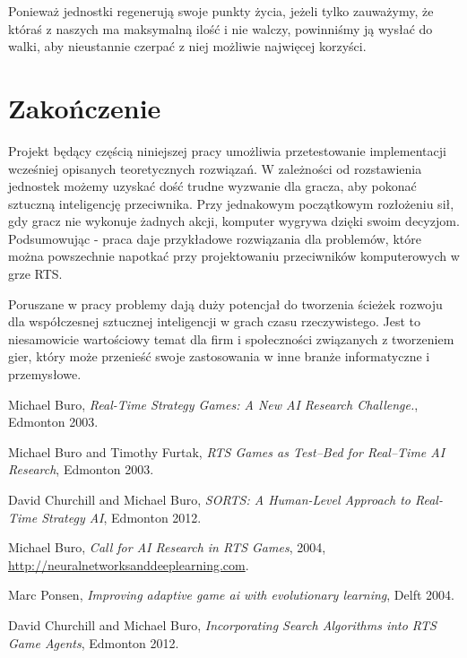 \documentclass[12pt]{report}
\begin{document}
Ponieważ jednostki regenerują swoje punkty życia, jeżeli tylko zauważymy, że któraś z naszych ma maksymalną ilość i nie walczy, powinniśmy ją wysłać do walki, aby nieustannie czerpać z niej możliwie najwięcej korzyści.

\section{Zakończenie}
Projekt będący częścią niniejszej pracy umożliwia przetestowanie implementacji wcześniej opisanych teoretycznych rozwiązań. W zależności od rozstawienia jednostek możemy uzyskać dość trudne wyzwanie dla gracza, aby pokonać sztuczną inteligencję przeciwnika. Przy jednakowym początkowym rozłożeniu sił, gdy gracz nie wykonuje żadnych akcji, komputer wygrywa dzięki swoim decyzjom. Podsumowując - praca daje przykładowe rozwiązania dla problemów, które można powszechnie napotkać przy projektowaniu przeciwników komputerowych w grze RTS.

Poruszane w pracy problemy dają duży potencjał do tworzenia ścieżek rozwoju dla współczesnej sztucznej inteligencji w grach czasu rzeczywistego. Jest to niesamowicie wartościowy temat dla firm i społeczności związanych z tworzeniem gier, który może przenieść swoje zastosowania w inne branże informatyczne i przemysłowe.




\cleardoublepage
{}
\begin{thebibliography}{9}

 Michael Buro, \emph{Real-Time Strategy Games: A New AI Research Challenge.}, Edmonton 2003.

 Michael Buro and Timothy Furtak, \emph{RTS Games as Test–Bed for Real–Time AI Research}, Edmonton 2003.

 David Churchill and Michael Buro, \emph{SORTS: A Human-Level Approach to Real-Time Strategy AI}, Edmonton 2012.

 Michael Buro, \emph{Call for AI Research in RTS Games}, 2004, \href{http://neuralnetworksanddeeplearning.com}{http://neuralnetworksanddeeplearning.com}.

 Marc Ponsen, \emph{Improving adaptive game ai with evolutionary learning}, Delft 2004.

 David Churchill and Michael Buro, \emph{Incorporating Search Algorithms into RTS Game Agents}, Edmonton 2012.



\end{thebibliography}
\end{document}
